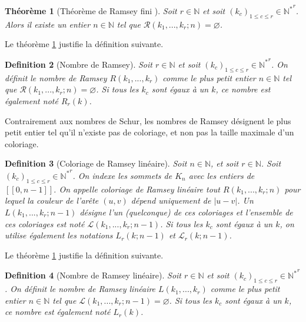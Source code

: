 \documentclass{article}
\newtheorem{definition}{Definition}[section]
\newtheorem{theorem}[definition]{Théorème}
\begin{document}
\begin{theorem}[Théorème de Ramsey fini \cite{Ramsey}]
\label{thm:ram}
Soit \(r \in \mathbb{N}\) et soit \((k_c)_{1 \leqslant c \leqslant r} \in {\mathbb{N}^*}^r\). Alors il existe un entier \(n \in \mathbb{N}\) tel que \(\mathcal{R}(k_1, ..., k_r ; n) = \varnothing\).
\end{theorem}

Le théorème \ref{thm:ram} justifie la définition suivante.

\begin{definition}[Nombre de Ramsey]
Soit \(r \in \mathbb{N}\) et soit \((k_c)_{1 \leqslant c \leqslant r} \in {\mathbb{N}^*}^r\). On définit le nombre de Ramsey \(R(k_1, ..., k_r)\) comme le plus petit entier \(n \in \mathbb{N}\) tel que \(\mathcal{R}(k_1, ..., k_r ; n) = \varnothing\). Si tous les \(k_c\) sont égaux à un \(k\), ce nombre est également noté \(R_r(k)\).
\end{definition}

Contrairement aux nombres de Schur, les nombres de Ramsey désignent le plus petit entier tel qu'il n'existe pas de coloriage, et non pas la taille maximale d'un coloriage.

\begin{definition}[Coloriage de Ramsey linéaire]
Soit \(n \in \mathbb{N}\), et soit \(r \in \mathbb{N}\). Soit \((k_c)_{1 \leqslant c \leqslant r} \in {\mathbb{N}^*}^r\). On indexe les sommets de \(K_n\) avec les entiers de \([\![0, n - 1]\!]\). On appelle coloriage de Ramsey linéaire tout \(R(k_1, ..., k_r ; n)\) pour lequel la couleur de l'arête \((u, v)\) dépend uniquement de \(|u - v|\). Un \(L(k_1, ..., k_r ; n - 1)\) désigne l'un (quelconque) de ces coloriages et l'ensemble de ces coloriages est noté \(\mathcal{L}(k_1, ..., k_r ; n - 1)\). Si tous les \(k_c\) sont égaux à un \(k\), on utilise également les notations \(L_r(k; n - 1)\) et \(\mathcal{L}_r(k; n - 1)\).
\end{definition}

Le théorème \ref{thm:ram} justifie la définition suivante.

\begin{definition}[Nombre de Ramsey linéaire]
Soit \(r \in \mathbb{N}\) et soit \((k_c)_{1 \leqslant c \leqslant r} \in {\mathbb{N}^*}^r\). On définit le nombre de Ramsey linéaire \(L(k_1, ..., k_r)\) comme le plus petit entier \(n \in \mathbb{N}\) tel que \(\mathcal{L}(k_1, ..., k_r ; n - 1) = \varnothing\). Si tous les \(k_c\) sont égaux à un \(k\), ce nombre est également noté \(L_r(k)\).
\end{definition}
\end{document}
